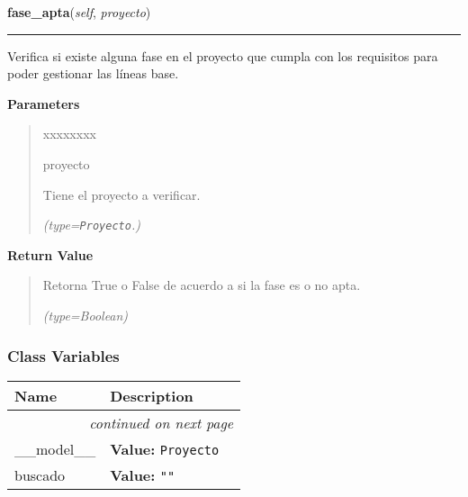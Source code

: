 \hspace{.8\funcindent}\begin{boxedminipage}{\funcwidth}

    \raggedright \textbf{fase\_apta}(\textit{self}, \textit{proyecto})

    \vspace{-1.5ex}

    \rule{\textwidth}{0.5\fboxrule}
\setlength{\parskip}{2ex}
    Verifica si existe alguna fase en el proyecto que cumpla con los 
    requisitos para poder gestionar las líneas base.

\setlength{\parskip}{1ex}
      \textbf{Parameters}
      \vspace{-1ex}

      \begin{quote}
        \begin{Ventry}{xxxxxxxx}

          \item[proyecto]

          Tiene el proyecto a verificar.

            {\it (type=\texttt{Proyecto}.)}

        \end{Ventry}

      \end{quote}

      \textbf{Return Value}
    \vspace{-1ex}

      \begin{quote}
      Retorna True o False de acuerdo a si la fase es o no apta.

      {\it (type=Boolean)}

      \end{quote}

    \end{boxedminipage}



  \subsubsection{Class Variables}

    \vspace{-1cm}
\hspace{\varindent}\begin{longtable}{|p{\varnamewidth}|p{\vardescrwidth}|l}
\cline{1-2}
\cline{1-2} \centering \textbf{Name} & \centering \textbf{Description}& \\
\cline{1-2}
\endhead\cline{1-2}\multicolumn{3}{r}{\small\textit{continued on next page}}\\\endfoot\cline{1-2}
\endlastfoot\raggedright \_\-\_\-m\-o\-d\-e\-l\-\_\-\_\- & \raggedright \textbf{Value:} 
{\tt Proyecto}&\\
\cline{1-2}
\raggedright b\-u\-s\-c\-a\-d\-o\- & \raggedright \textbf{Value:} 
{\tt ""}&\\
\cline{1-2}
\end{longtable}

